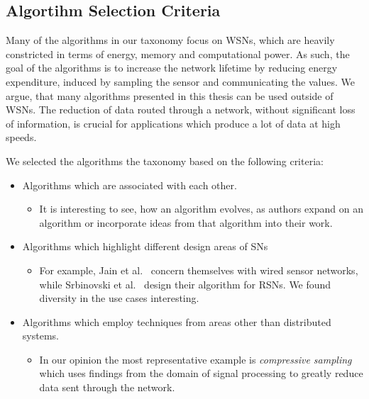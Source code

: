 \subsection{Algortihm Selection Criteria}
\label{sec:Algortihm selection criteria}

Many of the algorithms in our taxonomy focus on \acp{WSN}, which are heavily
constricted in terms of energy, memory and computational power. As such, the
goal of the algorithms is to increase the network lifetime by reducing energy
expenditure, induced by sampling the sensor and communicating the values. We
argue, that many algorithms presented in this thesis can be used outside of
\acp{WSN}. The reduction of data routed through a network, without significant
loss of information, is crucial for applications which produce a lot of data at
high speeds.

We selected the algorithms the taxonomy based on the following criteria:

\begin{itemize}
    \item Algorithms which are associated with each other.
    \begin{itemize}
        \item It is interesting to see, how an algorithm evolves, as authors
        expand on an algorithm or incorporate ideas from that algorithm into
        their work.
    \end{itemize}
    \item Algorithms which highlight different design areas of \acp{SN}
    \begin{itemize}
        \item For example, Jain et al.~\cite{jain2004adaptive} concern
        themselves with wired sensor networks, while Srbinovski et
        al.~\cite{srbinovski2016energy} design their algorithm for \acp{RSN}.
        We found diversity in the use cases interesting.
    \end{itemize}
    \item Algorithms which employ techniques from areas other than distributed
    systems. 
    \begin{itemize}
        \item In our opinion the most representative example is
        \textit{compressive sampling} which uses findings from the domain of
        signal processing to greatly reduce data sent through the network.
    \end{itemize}
\end{itemize}

